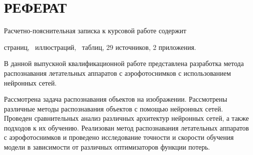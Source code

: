 \setcounter{page}{5}

\chapter*{РЕФЕРАТ}

Расчетно-пояснительная записка к курсовой работе содержит  \begin{NoHyper}\pageref{LastPage}\end{NoHyper} страниц, \totfig~иллюстраций, \tottab~таблиц, 29 источников, 2 приложения.

В данной выпускной квалификационной работе представлена разработка метода распознавания летательных аппаратов с аэрофотоснимков с использованием нейронных сетей.

Рассмотрена задача распознавания объектов на изображении. Рассмотрены различные методы распознавания объектов с помощью нейронных сетей. Проведен сравнительных анализ различных архитектур нейронных сетей, а также подходов к их обучению. Реализован метод распознавания летательных аппаратов с аэрофотоснимков и проведено исследование точности и скорости обучения модели в зависимости от различных оптимизаторов функции потерь.
